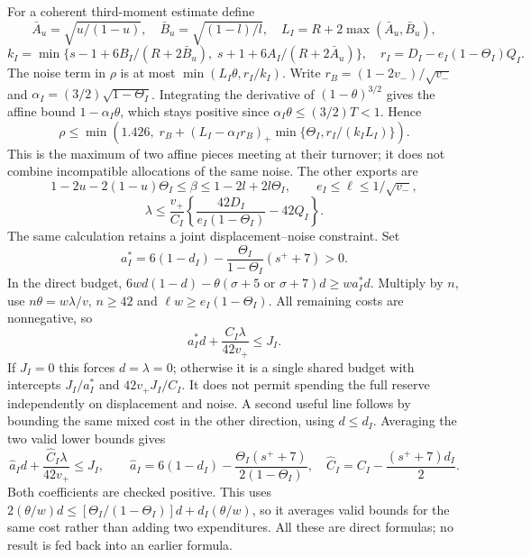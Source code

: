 For a coherent third-moment estimate define
\[
 \bar A_u=\sqrt{u/(1-u)},\quad\bar B_u=\sqrt{(1-l)/l},\quad
 L_I=R+2\max(\bar A_u,\bar B_u),
\]
\[
 k_I=\min\{s-1+6B_I/(R+2\bar B_u),\;
                 s+1+6A_I/(R+2\bar A_u)\},\quad
 r_I=D_I-e_I(1-\Theta_I)Q_I.
\]
The noise term in $\rho$ is at most $\min(L_I\theta,r_I/k_I)$.
Write $r_B=(1-2v_-)/\sqrt{v_-}$ and
$\alpha_I=(3/2)\sqrt{1-\Theta_I}$. Integrating the derivative of
$(1-\theta)^{3/2}$ gives the affine bound
$1-\alpha_I\theta$, which stays positive since
$\alpha_I\theta\le(3/2)T<1$. Hence
\[
 \rho\le\min\left(1.426,\;
 r_B+(L_I-\alpha_Ir_B)_+
             \min\{\Theta_I,r_I/(k_IL_I)\}\right).
\]
This is the maximum of two affine pieces meeting at their turnover; it
does not combine incompatible allocations of the same noise.
The other exports are
\[
 1-2u-2(1-u)\Theta_I\le\beta\le1-2l+2l\Theta_I,
 \qquad e_I\le\ell\le1/\sqrt{v_-},
\]
\[
 \lambda\le\frac{v_+}{C_I}
      \left\{\frac{42D_I}{e_I(1-\Theta_I)}-42Q_I\right\}.
\]
The same calculation retains a joint displacement--noise constraint. Set
\[
 a_I^*=6(1-d_I)-\frac{\Theta_I}{1-\Theta_I}(s^++7)>0.
\]
In the direct budget,
$6wd(1-d)-\theta(\sigma+5\text{ or }\sigma+7)d\ge w a_I^*d$.
Multiply by $n$, use $n\theta=w\lambda/v$, $n\ge42$ and
$\ell w\ge e_I(1-\Theta_I)$. All remaining costs are nonnegative, so
\begin{equation}\label{v10:geometry:joint}
 a_I^*d+\frac{C_I\lambda}{42v_+}\le J_I.
\end{equation}
If $J_I=0$ this forces $d=\lambda=0$; otherwise it is a single shared
budget with intercepts $J_I/a_I^*$ and $42v_+J_I/C_I$. It does not permit
spending the full reserve independently on displacement and noise.
A second useful line follows by bounding the same mixed cost in the other
direction, using $d\le d_I$. Averaging the two valid lower bounds gives
\[
 \widehat a_I d+\frac{\widehat C_I\lambda}{42v_+}\le J_I,\qquad
 \widehat a_I=6(1-d_I)-\frac{\Theta_I(s^++7)}{2(1-\Theta_I)},\quad
 \widehat C_I=C_I-\frac{(s^++7)d_I}{2}.
\]
Both coefficients are checked positive. This uses
$2(\theta/w)d\le[\Theta_I/(1-\Theta_I)]d+d_I(\theta/w)$, so it averages
valid bounds for the same cost rather than adding two expenditures.
All these are direct formulas; no result is fed back into an earlier formula.


